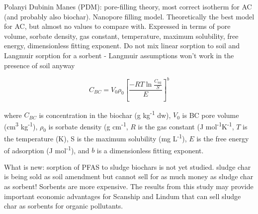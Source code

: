 Polanyi Dubinin Manes (PDM): pore-filling theory, most correct isotherm for AC (and probably also biochar). Nanopore filling model. Theoretically the best model for AC, but almost no values to compare with. Expressed in terms of pore volume, sorbate density, gas constant, temperature, maximum solubility, free energy, dimensionless fitting exponent. 
Do not mix linear sorption to soil and Langmuir sorption for a sorbent - Langmuir assumptions won't work in the presence of soil anyway

\begin{equation} \label{eq:PDM}
    C_{BC} = V_0\rho_0 \left [ \frac{-RT\ln \frac{C_{aq}}{S}}{E}\right ]^b
\end{equation}


where $C_{BC}$ is concentration in the biochar (g kg\textsuperscript{-1} dw), $V_0$ is BC pore volume (cm\textsuperscript{3} kg\textsuperscript{-1}), $\rho_0$ is sorbate density (g cm\textsuperscript{-1}, $R$ is the gas constant (J mol\textsuperscript{-1}K\textsuperscript{-1}, $T$ is the temperature (K), S is the maximum solubility (mg L\textsuperscript{-1}), $E$ is the free energy of adsorption (J mol\textsuperscript{-1}), and $b$ is a dimensionless fitting exponent. 

What is new: sorption of PFAS to sludge biochars is not yet studied. sludge char is being sold as soil amendment but cannot sell for as much money as sludge char as sorbent! Sorbents are more expensive. The results from this study may provide important economic advantages for Scanship and Lindum that can sell sludge char as sorbents for organic pollutants.

